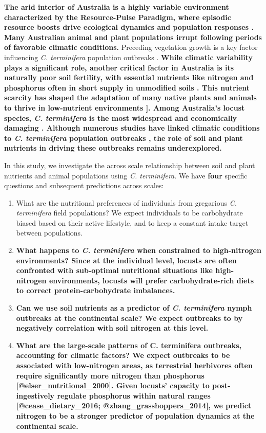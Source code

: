 \documentclass[
]{article}
\begin{document}
\textbf{The arid interior of Australia is a highly variable environment
\citep{morton_fresh_2011} characterized by the Resource-Pulse Paradigm,
where episodic resource boosts drive ecological dynamics and population
responses \citep{noy-meir_desert_1974, whitford_ecology_2002}. Many
Australian animal and plant populations irrupt following periods of
favorable climatic conditions.} Preceding vegetation growth is a key
factor influencing \emph{C. terminifera} population outbreaks
\citep{lawton_seeing_2022}. \textbf{While climatic variability plays a
significant role, another critical factor in Australia is its naturally
poor soil fertility, with essential nutrients like nitrogen and
phosphorus often in short supply in unmodified soils
\citep{morton_fresh_2011, orians_ecology_2007}. This nutrient scarcity
has shaped the adaptation of many native plants and animals to thrive in
low-nutrient environments \citep{orians_ecology_2007}{]}. Among
Australia's locust species, \emph{C. terminifera} is the most widespread
and economically damaging \citep{hunter_adaptations_2001}. Although
numerous studies have linked climatic conditions to \emph{C.
terminifera} population outbreaks
\citep{clark_influence_1974, deveson_not_2005, farrow_population_1982, key_general_1945},
the role of soil and plant nutrients in driving these outbreaks remains
underexplored.}

In this study, we investigate the across scale relationship between soil
and plant nutrients and animal populations using \emph{C. terminifera}.
We have \textbf{four} specific questions and subsequent predictions
across scales:

\begin{enumerate}
\def\labelenumi{\arabic{enumi})}
\item
  What are the nutritional preferences of individuals from gregarious
  \emph{C. terminifera} field populations? We expect individuals to be
  carbohydrate biased based on their active lifestyle, and to keep a
  constant intake target between populations.
\item
  \textbf{What happens to \emph{C. terminifera} when constrained to
  high-nitrogen environments? Since at the individual level, locusts are
  often confronted with sub-optimal nutritional situations like
  high-nitrogen environments, locusts will prefer carbohydrate-rich
  diets to correct protein-carbohydrate imbalances.}
\item
  \textbf{Can we use soil nutrients as a predictor of \emph{C.
  terminifera} nymph outbreaks at the continental scale? We expect
  outbreaks to by negatively correlation with soil nitrogen at this
  level.}
\item
  \textbf{What are the large-scale patterns of C. terminifera outbreaks,
  accounting for climatic factors? We expect outbreaks to be associated
  with low-nitrogen areas, as terrestrial herbivores often require
  significantly more nitrogen than phosphorus
  {[}@elser\_nutritional\_2000{]}. Given locusts' capacity to
  post-ingestively regulate phosphorus within natural ranges
  {[}@cease\_dietary\_2016; @zhang\_grasshoppers\_2014{]}, we predict
  nitrogen to be a stronger predictor of population dynamics at the
  continental scale.}
\end{enumerate}
\end{document}
